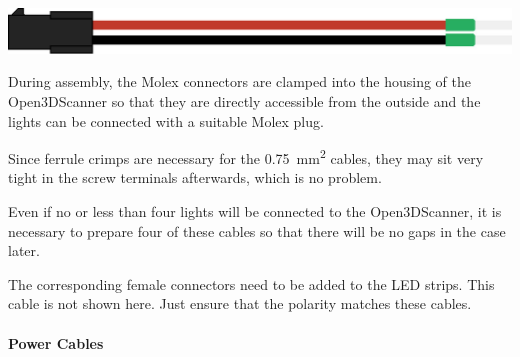 \includegraphics[width=\linewidth]{images/LedStripCable.jpg}%
{}%

During assembly, the Molex connectors are clamped into the housing of the Open3DScanner so that they are directly accessible from the outside and the lights can be connected with a suitable Molex plug.%

Since ferrule crimps are necessary for the \SI{0.75}{\milli\meter\squared} cables, they may sit very tight in the screw terminals afterwards, which is no problem.%

Even if no or less than four lights will be connected to the Open3DScanner, it is necessary to prepare four of these cables so that there will be no gaps in the case later.%

The corresponding female connectors need to be added to the LED strips. This cable is not shown here. Just ensure that the polarity matches these cables.%

\clearpage%

\paragraph{Power Cables}\mbox{}\\%

%

